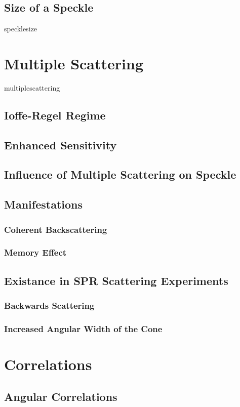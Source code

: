 \documentclass[a4paper,titlepage,onecolumn]{report}
\begin{document}
\subsection{Size of a Speckle}
{specklesize}
\section{Multiple Scattering} \label{sec:multiplescattering}
{multiplescattering}
\subsection{Ioffe-Regel Regime}
\subsection{Enhanced Sensitivity}
\subsection{Influence of Multiple Scattering on Speckle}
\subsection{Manifestations}
\subsubsection{Coherent Backscattering}
\subsubsection{Memory Effect}
\subsection{Existance in SPR Scattering Experiments}
\subsubsection{Backwards Scattering}
\subsubsection{Increased Angular Width of the Cone}
\section{Correlations}
\subsection{Angular Correlations}
\end{document}
